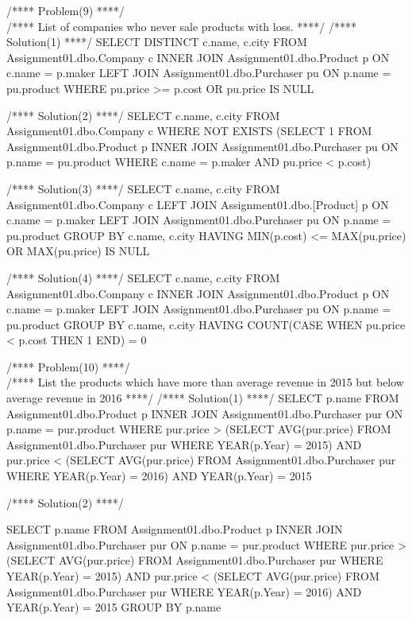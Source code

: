 /**** Problem(9) ****/\\
/**** List of companies who never sale products with loss. ****/ /****
Solution(1) ****/ SELECT DISTINCT c.name, c.city FROM
Assignment01.dbo.Company c INNER JOIN Assignment01.dbo.Product p ON
c.name = p.maker LEFT JOIN Assignment01.dbo.Purchaser pu ON p.name =
pu.product WHERE pu.price \textgreater= p.cost OR pu.price IS NULL

/**** Solution(2) ****/ SELECT c.name, c.city FROM
Assignment01.dbo.Company c WHERE NOT EXISTS (SELECT 1 FROM
Assignment01.dbo.Product p INNER JOIN Assignment01.dbo.Purchaser pu ON
p.name = pu.product WHERE c.name = p.maker AND pu.price \textless{}
p.cost)

/**** Solution(3) ****/ SELECT c.name, c.city FROM
Assignment01.dbo.Company c LEFT JOIN Assignment01.dbo.{[}Product{]} p ON
c.name = p.maker LEFT JOIN Assignment01.dbo.Purchaser pu ON p.name =
pu.product GROUP BY c.name, c.city HAVING MIN(p.cost) \textless=
MAX(pu.price) OR MAX(pu.price) IS NULL

/**** Solution(4) ****/ SELECT c.name, c.city FROM
Assignment01.dbo.Company c INNER JOIN Assignment01.dbo.Product p ON
c.name = p.maker LEFT JOIN Assignment01.dbo.Purchaser pu ON p.name =
pu.product GROUP BY c.name, c.city HAVING COUNT(CASE WHEN pu.price
\textless{} p.cost THEN 1 END) = 0

/**** Problem(10) ****/\\
/**** List the products which have more than average revenue in 2015 but
below average revenue in 2016 ****/ /**** Solution(1) ****/ SELECT
p.name FROM Assignment01.dbo.Product p INNER JOIN
Assignment01.dbo.Purchaser pur ON p.name = pur.product WHERE pur.price
\textgreater{} (SELECT AVG(pur.price) FROM Assignment01.dbo.Purchaser
pur WHERE YEAR(p.Year) = 2015) AND pur.price \textless{} (SELECT
AVG(pur.price) FROM Assignment01.dbo.Purchaser pur WHERE YEAR(p.Year) =
2016) AND YEAR(p.Year) = 2015

/**** Solution(2) ****/

SELECT p.name FROM Assignment01.dbo.Product p INNER JOIN
Assignment01.dbo.Purchaser pur ON p.name = pur.product WHERE pur.price
\textgreater{} (SELECT AVG(pur.price) FROM Assignment01.dbo.Purchaser
pur WHERE YEAR(p.Year) = 2015) AND pur.price \textless{} (SELECT
AVG(pur.price) FROM Assignment01.dbo.Purchaser pur WHERE YEAR(p.Year) =
2016) AND YEAR(p.Year) = 2015 GROUP BY p.name
